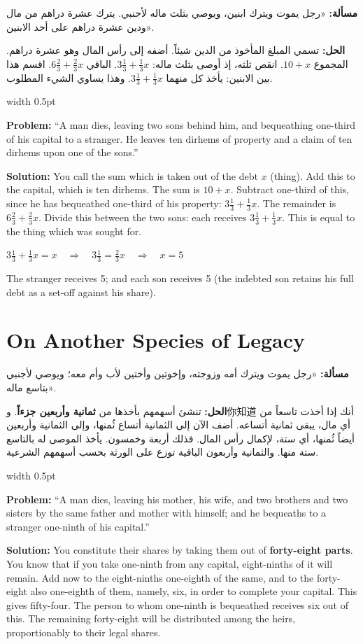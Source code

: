 \documentclass[10pt,a4paper]{book}
\newlength{\colwidth}
\newcommand{\bilingualpair}[2]{%
  \noindent
  \begin{minipage}[t]{\colwidth}
  \begin{flushright}
  \vspace{0pt}
  {\arabicfont\small #1}
  \end{flushright}
  \end{minipage}%
  \hfill\textcolor{columnsepclr}{\vrule width 0.5pt}\hfill
  \begin{minipage}[t]{\colwidth}
  \vspace{0pt}
  {\small #2}
  \end{minipage}%
  \par\vspace{0.6em}
}
\begin{document}
\bilingualpair{
\textbf{مسألة:} «رجل يموت ويترك ابنين، ويوصي بثلث ماله
لأجنبي. يترك عشرة دراهم من مال ودين عشرة دراهم على
أحد الابنين».

\textbf{الحل:} تسمي المبلغ المأخوذ من الدين شيئاً. أضفه إلى
رأس المال وهو عشرة دراهم. المجموع $10 + x$. انقص ثلثه،
إذ أوصى بثلث ماله: $3\tfrac{1}{3} + \tfrac{1}{3}x$. الباقي
$6\tfrac{2}{3} + \tfrac{2}{3}x$. اقسم هذا بين الابنين: يأخذ كل
منهما $3\tfrac{1}{3} + \tfrac{1}{3}x$. وهذا يساوي الشيء المطلوب.
}{
\textbf{Problem:} ``A man dies, leaving two sons behind him, and bequeathing
one-third of his capital to a stranger. He leaves ten dirhems of property and
a claim of ten dirhems upon one of the sons.''

\textbf{Solution:} You call the sum which is taken out of the debt $x$ (thing).
Add this to the capital, which is ten dirhems. The sum is $10 + x$.
Subtract one-third of this, since he has bequeathed one-third of his
property: $3\tfrac{1}{3} + \tfrac{1}{3}x$. The remainder is $6\tfrac{2}{3} +
\tfrac{2}{3}x$. Divide this between the two sons: each receives $3\tfrac{1}{3}
+ \tfrac{1}{3}x$. This is equal to the thing which was sought for.
}

\begin{mathbox}
$3\tfrac{1}{3} + \tfrac{1}{3}x = x \quad\Rightarrow\quad 3\tfrac{1}{3} = \tfrac{2}{3}x \quad\Rightarrow\quad x = 5$

The stranger receives 5; and each son receives 5 (the indebted son retains
his full debt as a set-off against his share).
\end{mathbox}

\section*{On Another Species of Legacy}

\bilingualpair{
\textbf{مسألة:} «رجل يموت ويترك أمه وزوجته، وإخوتين
وأختين لأب وأم معه؛ ويوصي لأجنبي بتاسع ماله».

\textbf{الحل:} تنشئ أسهمهم بأخذها من \textbf{ثمانية وأربعين
جزءاً}. و你知道 أنك إذا أخذت تاسعاً من أي مال، يبقى ثمانية
أتساعه. أضف الآن إلى الثمانية أتساع ثُمنها، وإلى الثمانية
وأربعين أيضاً ثُمنها، أي ستة، لإكمال رأس المال. فذلك
أربعة وخمسون. يأخذ الموصى له بالتاسع ستة منها. والثمانية
وأربعون الباقية توزع على الورثة بحسب أسهمهم الشرعية.
}{
\textbf{Problem:} ``A man dies, leaving his mother, his wife, and two
brothers and two sisters by the same father and mother with himself; and he
bequeaths to a stranger one-ninth of his capital.''

\textbf{Solution:} You constitute their shares by taking them out of
\textbf{forty-eight parts}. You know that if you take one-ninth from any
capital, eight-ninths of it will remain. Add now to the eight-ninths
one-eighth of the same, and to the forty-eight also one-eighth of them,
namely, six, in order to complete your capital. This gives fifty-four. The
person to whom one-ninth is bequeathed receives six out of this. The
remaining forty-eight will be distributed among the heirs, proportionably to
their legal shares.
}
\end{document}
